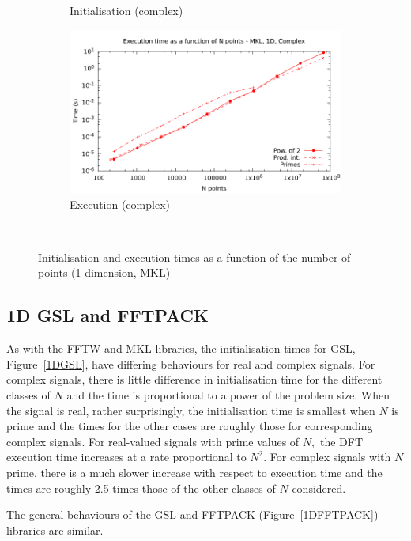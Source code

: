 \documentclass[12pt, a4paper]{article} \setlength{\textheight}{24cm}
\begin{document}
\begin{figure}[htb]
\begin{subfigure}{.5\textwidth}
    \caption{Initialisation (complex)}
    \label{1DMKLCI}
  \end{subfigure}%
  \begin{subfigure}{.5\textwidth}
    \centering
    \includegraphics[width=.9\linewidth]{graphs/1d-mkl-exec-c.pdf}
    \caption{Execution (complex)}
    \label{1DMKLC}
  \end{subfigure}\\
  \caption{Initialisation and execution times as a function of the
    number of points (1 dimension, MKL)}
  \label{1DMKL}
\end{figure}

\subsection{1D GSL and FFTPACK}
As with the FFTW and MKL libraries, the initialisation times for GSL,
Figure~\ref{1DGSL}, have differing behaviours for real and complex
signals. For complex signals, there is little difference in
initialisation time for the different classes of $N$ and the time is
proportional to a power of the problem size. When the signal is real,
rather surprisingly, the initialisation time is smallest when $N$ is
prime and the times for the other cases are roughly those for
corresponding complex signals. For real-valued signals with prime
values of $N,$ the DFT execution time increases at a rate proportional
to $N^2.$ For complex signals with $N$ prime, there is a much slower
increase with respect to execution time and the times are roughly 2.5
times those of the other classes of $N$ considered.

The general behaviours of the GSL and FFTPACK (Figure~\ref{1DFFTPACK})
libraries are similar.
\end{document}

